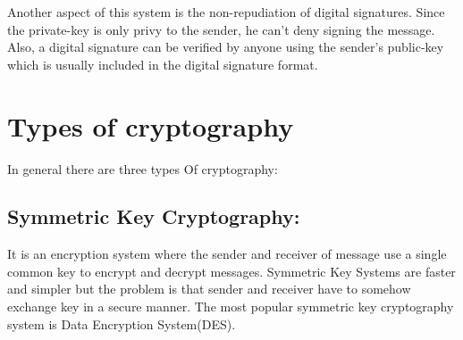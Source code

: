 \documentclass{report}
\theoremstyle{definition}
\begin{document}
{{{Another aspect of this system is the non-repudiation of digital signatures. Since the private-key is only privy to the sender, he can’t deny signing the message. Also, a digital signature can be verified by anyone using the sender’s public-key which is usually included in the digital signature format.}
\section{Types of cryptography}
In general there are three types Of cryptography:
\subsection{Symmetric Key Cryptography:}
\Large{It is an encryption system where the sender and receiver of message use a single common key to encrypt and decrypt messages. Symmetric Key Systems are faster and simpler but the problem is that sender and receiver have to somehow exchange key in a secure manner. The most popular symmetric key cryptography system is Data Encryption System(DES).

}}}
\end{document}
